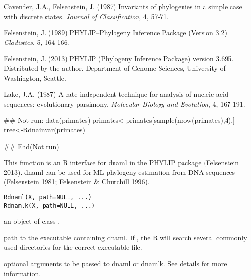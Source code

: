 \documentclass[a4paper]{book}
\begin{document}
%
\begin{References}\relax
Cavender, J.A., Felsenstein, J. (1987) Invariants of phylogenies in a simple case with discrete states. \emph{Journal of Classification}, 4, 57-71. 

Felsenstein, J. (1989) PHYLIP--Phylogeny Inference Package (Version 3.2). \emph{Cladistics}, 5, 164-166.

Felsenstein, J. (2013) PHYLIP (Phylogeny Inference Package) version 3.695. Distributed by the author. Department of Genome Sciences, University of Washington, Seattle.

Lake, J.A. (1987) A rate-independent technique for analysis of nucleic acid sequences: evolutionary parsimony. \emph{Molecular Biology and Evolution}, 4, 167-191. 
\end{References}
%
\begin{SeeAlso}\relax
{}
\end{SeeAlso}
%
\begin{Examples}
\begin{ExampleCode}
## Not run: 
data(primates)
primates<-primates[sample(nrow(primates),4),]
tree<-Rdnainvar(primates)

## End(Not run)
\end{ExampleCode}
\end{Examples}
%
\begin{Description}\relax
This function is an R interface for dnaml in the PHYLIP package (Felsenstein 2013). dnaml can be used for ML phylogeny estimation from DNA sequences (Felsenstein 1981; Felsenstein \& Churchill 1996).
\end{Description}
%
\begin{Usage}
\begin{verbatim}
Rdnaml(X, path=NULL, ...)
Rdnamlk(X, path=NULL, ...)
\end{verbatim}
\end{Usage}
%
\begin{Arguments}
\begin{ldescription}
\item[\code{X}] an object of class .
\item[\code{path}] path to the executable containing dnaml. If , the R will search several commonly used directories for the correct executable file.
\item[\code{...}] optional arguments to be passed to dnaml or dnamlk. See details for more information.
\end{ldescription}
\end{Arguments}
\end{document}
